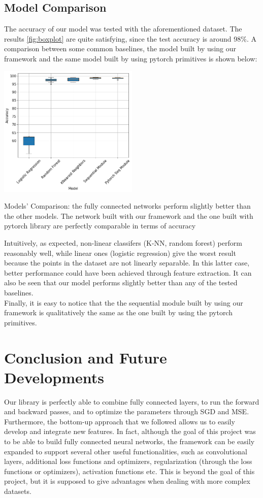 \documentclass[10pt,conference,compsocconf]{IEEEtran}
\begin{document}
\subsection{Model Comparison}
The accuracy of our model was tested with the aforementioned dataset. The results \ref{fig:boxplot} are quite satisfying, since the test accuracy is around 98\%.
A comparison between some common baselines, the model built by using our framework and the same model built by using pytorch primitives is shown below:
\begin{center}
	\captionsetup{type=figure}
	\includegraphics[width=0.5\textwidth]{img/boxplots_final.png}
	\caption{Models' Comparison: the fully connected networks perform slightly better than the other models. The network built with our framework and the one built with pytorch library are perfectly comparable in terms of accuracy}
	\label{fig:boxplot}
\end{center}
Intuitively, as expected, non-linear classifers (K-NN, random forest) perform
reasonably well, while linear ones (logistic regression) give the worst result
because the points in the dataset are not linearly separable. In this latter case,
better performance could have been achieved through feature extraction.
It can also be seen that our model performs slightly better than any of the tested
baselines.\\
Finally, it is easy to notice that the the sequential module built by using our framework is qualitatively the same as the one built by using the pytorch primitives.
\section{Conclusion and Future Developments}
Our library is perfectly able to combine fully connected layers, to run the forward and backward passes, and to optimize the parameters through SGD and MSE.
\\Furthermore, the bottom-up approach that we followed allows us to easily develop and integrate new features. In fact, although the goal of this project was to be able to build fully connected neural networks, the framework can be easily expanded to support several other useful functionalities, such as convolutional layers, additional loss functions and optimizers, regularization (through the loss functions or optimizers), activation functions etc. This is beyond the goal of this project, but it is supposed to give advantages when dealing with more complex datasets.
\end{document}
